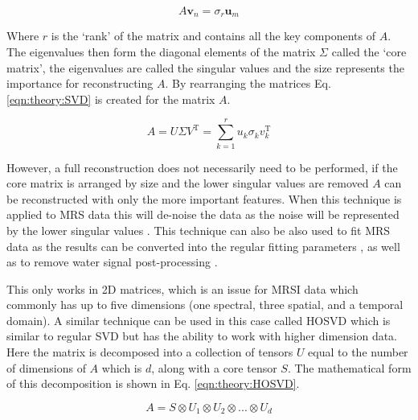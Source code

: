 \begin{equation}
    A \mathbf{v}_n = \sigma_r \mathbf{u}_m
\end{equation}

\noindent Where $r$ is the `rank' of the matrix and contains all the key components of $A$. The eigenvalues then form the diagonal elements of the matrix $\Sigma$ called the `core matrix', the eigenvalues are called the singular values and the size represents the importance for reconstructing $A$. By rearranging the matrices Eq. \ref{eqn:theory:SVD} is created for the matrix $A$.

\begin{equation}
    A = U\Sigma V^\textrm{T} = \sum_{k=1}^{r} u_k\sigma_kv_k^\textrm{T}
    \label{eqn:theory:SVD}
\end{equation}

\noindent However, a full reconstruction does not necessarily need to be performed, if the core matrix is arranged by size and the lower singular values are removed $A$ can be reconstructed with only the more important features. When this technique is applied to \ac{MRS} data this will de-noise the data as the noise will be represented by the lower singular values \cite{Brender2019DynamicHyperpolarization}. This technique can also be also used to fit \ac{MRS} data as the results can be converted into the regular fitting parameters \cite{Pijnappel1992SVD-basedSignals}, as well as to remove water signal post-processing \cite{Cabanes2001OptimizationBrain}.

This only works in 2D matrices, which is an issue for \ac{MRSI} data which commonly has up to five dimensions (one spectral, three spatial, and a temporal domain). A similar technique can be used in this case called \ac{HOSVD} which is similar to regular \ac{SVD} but has the ability to work with higher dimension data. Here the matrix is decomposed into a collection of tensors $U$ equal to the number of dimensions of $A$ which is $d$, along with a core tensor $S$. The mathematical form of this decomposition is shown in Eq. \ref{eqn:theory:HOSVD}.

\begin{equation}
    A = S \otimes U_1 \otimes U_2 \otimes ... \otimes U_d
    \label{eqn:theory:HOSVD}
\end{equation}

